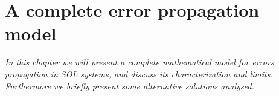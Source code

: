 \chapter{A complete error propagation model}
\label{ch::model}
%
%
  \textit{In this chapter we will present a complete mathematical model for errors propagation in \acs{SOL} systems, and discuss its characterization and limits. Furthermore we briefly present some alternative solutions analysed.}

  

  

  

  

  

  
  
  

  
  
  
  